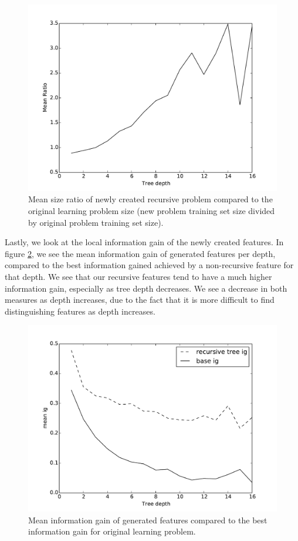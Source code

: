 \documentclass[twoside,11pt]{article}
\theoremstyle{definition}
\begin{document}
\begin{figure}[h!]
	\centering
	\includegraphics[scale=0.4]{problem_ratio}
	\caption{Mean size ratio of newly created recursive problem compared to the original learning problem size (new problem training set size divided by original problem training set size).}
	\label{fig:problem_ratio}
\end{figure}

Lastly, we look at the local information gain of the newly created features. In figure \ref{fig:local_ig_depth}, we see the mean information gain of generated features per depth, compared to the best information gained achieved by a non-recursive feature for that depth. We see that our recursive features tend to have a much higher information gain, especially as tree depth decreases. We see a decrease in both measures as depth increases, due to the fact that it is more difficult to find distinguishing features as depth increases.

\begin{figure}[h!]
	\centering
	\includegraphics[scale=0.4]{local_ig_depth}
	\caption{Mean information gain of generated features compared to the best information gain for original learning problem.}
	\label{fig:local_ig_depth}
\end{figure}
\end{document}
